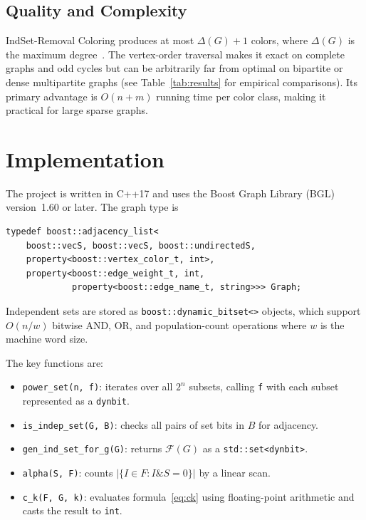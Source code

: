 \documentclass[11pt]{article}
\begin{document}
\subsection{Quality and Complexity}

IndSet-Removal Coloring produces at most $\Delta(G)+1$ colors, where $\Delta(G)$
is the maximum degree~\cite{Welsh1967}.  The vertex-order traversal makes it
exact on complete graphs and odd cycles but can be arbitrarily far from optimal
on bipartite or dense multipartite graphs (see Table~\ref{tab:results} for
empirical comparisons).  Its primary advantage is $O(n + m)$ running time per
color class, making it practical for large sparse graphs.

\section{Implementation}\label{sec:implementation}

The project is written in C++17 and uses the Boost Graph Library (BGL)
version~1.60 or later.  The graph type is

\begin{lstlisting}
typedef boost::adjacency_list<
    boost::vecS, boost::vecS, boost::undirectedS,
    property<boost::vertex_color_t, int>,
    property<boost::edge_weight_t, int,
             property<boost::edge_name_t, string>>> Graph;
\end{lstlisting}

Independent sets are stored as \texttt{boost::dynamic\_bitset<>} objects, which
support $O(n/w)$ bitwise AND, OR, and population-count operations where $w$ is
the machine word size.

The key functions are:

\begin{itemize}
  \item \texttt{power\_set(n, f)}: iterates over all $2^n$ subsets, calling
        \texttt{f} with each subset represented as a \texttt{dynbit}.
  \item \texttt{is\_indep\_set(G, B)}: checks all pairs of set bits in $B$ for
        adjacency.
  \item \texttt{gen\_ind\_set\_for\_g(G)}: returns $\mathcal{F}(G)$ as a
        \texttt{std::set<dynbit>}.
  \item \texttt{alpha(S, F)}: counts $|\{I \in F : I \mathbin{\&} S = 0\}|$
        by a linear scan.
  \item \texttt{c\_k(F, G, k)}: evaluates formula~\eqref{eq:ck} using
        floating-point arithmetic and casts the result to \texttt{int}.
\end{itemize}
\end{document}
